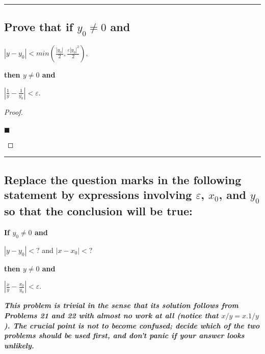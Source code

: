 \documentclass[letterpaper, 10 pt, conference]{ieeeconf}  %
\begin{document}
\noindent\rule{8cm}{0.4pt}
\begin{mdframed}
\subsection{\textbf{Prove that if $y_0 \neq 0$ and}}
\begin{center}
    $\left\lvert y - y_0 \right\rvert < min(\frac{\left\lvert y_0 \right\rvert}{2},\frac{\varepsilon\left\lvert y_0 \right\rvert^2}{2})$,
\end{center}
\textbf{then $y \neq 0$ and}
\begin{center}
    $\left\lvert \frac{1}{y} - \frac{1}{y_0} \right\rvert < \varepsilon$.
\end{center}
\end{mdframed}
\begin{proof}
\begin{align}
    
\end{align}
\begin{flushright}
$\blacksquare$
\end{flushright}
\end{proof}
\noindent\rule{8cm}{0.4pt}
\begin{mdframed}
\subsection{\textbf{Replace the question marks in the following statement by expressions involving $\varepsilon$, $x_0$, and $y_0$ so that the conclusion will be true:}}

\textbf{If $y_0 \neq 0$ and}

\begin{center}
    $\left\lvert y - y_0 \right\rvert < ?$ and $\left\lvert x - x_0\right\rvert < ?$
\end{center}

\textbf{then $y \neq 0$ and}

\begin{center}
    $\left\lvert \frac{x}{y} - \frac{x_0}{y_0} \right\rvert < \varepsilon$.
\end{center}

\textbf{\textit{This problem is trivial in the sense that its solution follows from Problems 21 and 22 with almost no work at all (notice that $x/y = x.1/y$). The crucial point is not to become confused; decide which of the two problems should be used first, and don't panic if your answer looks unlikely.}}
\end{mdframed}
\end{document}
